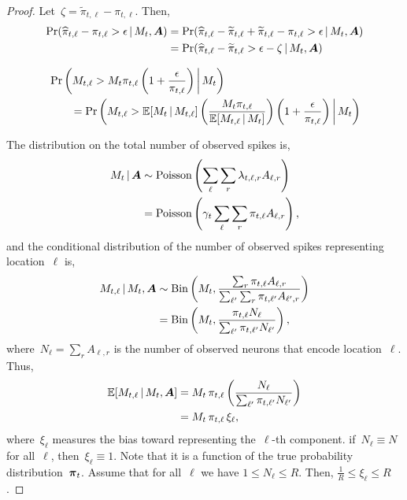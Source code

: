 \begin{proof}
  Let~$\zeta = \widetilde{\pi}_{t, \ell} - \pi_{t, \ell}$. Then,
  \begin{align}
    \Pr(\widehat{\pi}_{t,\ell} - \pi_{t, \ell} > \epsilon \,|\, M_t, \boldsymbol{A}) &=
    \Pr(\widehat{\pi}_{t, \ell} - \widetilde{\pi}_{t, \ell} +
    \widetilde{\pi}_{t, \ell} - \pi_{t, \ell} > \epsilon \,|\, M_t, \boldsymbol{A}) \\
    &= \Pr(\widehat{\pi}_{t, \ell} - \widetilde{\pi}_{t, \ell} > \epsilon - \zeta \,|\, M_t, \boldsymbol{A})
  \end{align}
      
  \begin{align}
    &\Pr \left(M_{t, \ell} >
    M_{t} \pi_{t, \ell}
    \left(1 + \frac{\epsilon}{\pi_{t, \ell}} \right) \bigg| \, M_t \right)
    \\
    &\qquad= \Pr \left(M_{t, \ell} >
    \mathbb{E}[M_t \,|\, M_{t, \ell}] 
    \left(\frac{M_{t} \pi_{t, \ell}}{\mathbb{E}[M_{t, \ell} \,|\, M_{t}]} \right)
    \left(1 + \frac{\epsilon}{\pi_{t, \ell}} \right) \bigg| \,M_t \right)
  \end{align}

  
  The distribution on the total number 
  of observed spikes is,
  \begin{align}
    M_t \,|\, \boldsymbol{A} &\sim \mathrm{Poisson} \left( \sum_\ell \sum_r \lambda_{t,\ell,r} A_{\ell, r} \right) \\
    &= \mathrm{Poisson} \left(\gamma_t \sum_\ell \sum_r \pi_{t, \ell} A_{\ell, r} \right),
  \end{align}
  and the conditional distribution of the number of observed spikes representing 
  location~$\ell$ is,
  \begin{align}
    M_{t, \ell} \,|\, M_t, \boldsymbol{A} 
    &\sim \mathrm{Bin} \left( M_t, 
      \frac{ \sum_r \pi_{t, \ell} A_{\ell, r}}
      { \sum_{\ell'}  \sum_r  \pi_{t, \ell'} A_{\ell', r}} \right) \\
      &= \mathrm{Bin} \left( M_t,
      \frac{ \pi_{t, \ell} N_\ell}{ \sum_{\ell'}  \pi_{t, \ell'}N_{\ell'}}  \right),
  \end{align} 
  where~$N_\ell=\sum_r A_{\ell, r}$ is the number of observed neurons
  that encode location~$\ell$. Thus,
  \begin{align}
    \mathbb{E}[M_{t,\ell} \,|\, M_t, \boldsymbol{A}] &=
    M_t  \, \pi_{t, \ell}
    \left(\frac{ N_\ell}{ \sum_{\ell'}  \pi_{t, \ell'}N_{\ell'}}\right) \\
    &= M_t \, \pi_{t, \ell} \, \xi_\ell,
  \end{align}
  where~$\xi_\ell$ measures the bias toward representing the~$\ell$-th component.
  if~$N_\ell \equiv N$ for all~$\ell$, then~$\xi_\ell \equiv 1$. Note that it
  is a function of the true probability distribution~$\boldsymbol{\pi}_t$. 
  Assume that for all~$\ell$ we have $1 \leq N_\ell \leq R$. Then,
  $\frac{1}{R} \leq \xi_\ell \leq R$.


\end{proof}
